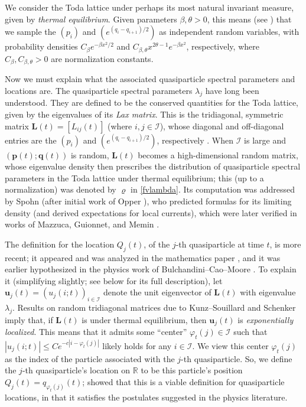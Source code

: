 \documentclass{amsart}
\numberwithin{equation}{section}
\theoremstyle{remark}
\theoremstyle{definition}
\begin{document}
	We consider the Toda lattice under perhaps its most natural invariant measure, given by \emph{thermal equilibrium}. Given parameters $\beta, \theta > 0$, this means (see ) that we sample the $(p_i)$ and $(e^{(q_i - q_{i+1})/2})$ as independent random variables, with probability densities $C_{\beta} e^{-\beta x^2 / 2}$ and $C_{\beta,\theta} x^{2\theta-1} e^{-\beta x^2}$, respectively, where $C_{\beta}, C_{\beta,\theta} > 0$ are normalization constants. 
	
	Now we must explain what the associated quasiparticle spectral parameters and locations are. The quasiparticle spectral parameters $\lambda_j$ have long been understood. They are defined to be the conserved quantities for the Toda lattice, given by the eigenvalues of its \emph{Lax matrix}. This is the tridiagonal, symmetric matrix $\bm{L}(t) = [L_{ij}(t)]$ (where $i, j \in \mathscr{I}$), whose diagonal and off-diagonal entries are the $(p_i)$ and $(e^{(q_i - q_{i+1})/2})$, respectively \cite{LEI,CIS}. When $\mathscr{I}$ is large and $(\bm{p} (t); \bm{q} (t))$ is random, $\bm{L}(t)$ becomes a high-dimensional random matrix, whose eigenvalue density then prescribes the distribution of quasiparticle spectral parameters in the Toda lattice under thermal equilibrium; this (up to a normalization) was denoted by $\varrho$ in \eqref{fvlambda}. Its computation was addressed by Spohn \cite{GECC} (after initial work of Opper \cite{ASCEC}), who predicted formulas for its limiting density (and derived expectations for local currents), which were later verified in works of Mazzuca, Guionnet, and Memin \cite{DSME,LDC,EIST}.
	
	
	The definition for the location $Q_j (t)$, of the $j$-th quasiparticle at time $t$, is more recent; it appeared and was analyzed in the mathematics paper \cite{LC}, and it was earlier hypothesized in the physics work of Bulchandini--Cao--Moore \cite{KTQL}. To explain it (simplifying slightly; see  below for its full description), let $\bm{u}_j (t) = (u_j (i;t))_{i \in \mathscr{I}}$ denote the unit eigenvector of $\bm{L}(t)$ with eigenvalue $\lambda_j$. Results on random tridiagonal matrices due to Kunz--Souillard \cite{SSO} and Schenker \cite{LRBM}   imply that, if $\bm{L}(t)$ is under thermal equilibrium, then $\bm{u}_j (t)$ is \emph{exponentially localized}. This means that it admits some ``center'' $\varphi_t (j) \in \mathscr{I}$ such that $|u_j (i; t)| \le C e^{-c|i-\varphi_t (j)|}$ likely holds for any $i \in \mathscr{I}$. We view this center $\varphi_t (j)$ as the index of the particle associated with the $j$-th quasiparticle. So, we define the $j$-th quasiparticle's location on $\mathbb{R}$ to be this particle's position $Q_j (t) = q_{\varphi_t (j)} (t)$; \cite{LC} showed that this is a viable definition for quasiparticle locations, in that it satisfies the postulates suggested in the physics literature.
	
\end{document}
